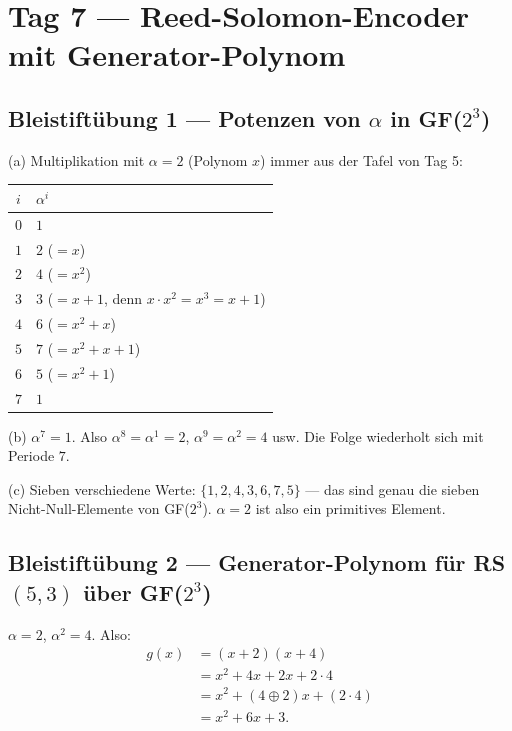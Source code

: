 \section{Tag 7 — Reed-Solomon-Encoder mit Generator-Polynom}

\subsection*{Bleistiftübung 1 — Potenzen von $\alpha$ in GF($2^3$)}

(a) Multiplikation mit $\alpha = 2$ (Polynom $x$) immer aus der
Tafel von Tag 5:

\begin{center}
\begin{tabular}{cl}
  \toprule
  $i$ & $\alpha^i$ \\
  \midrule
  $0$ & $1$ \\
  $1$ & $2$ ($= x$) \\
  $2$ & $4$ ($= x^2$) \\
  $3$ & $3$ ($= x + 1$, denn $x \cdot x^2 = x^3 = x + 1$) \\
  $4$ & $6$ ($= x^2 + x$) \\
  $5$ & $7$ ($= x^2 + x + 1$) \\
  $6$ & $5$ ($= x^2 + 1$) \\
  $7$ & $1$ \\
  \bottomrule
\end{tabular}
\end{center}

(b) $\alpha^7 = 1$. Also $\alpha^8 = \alpha^1 = 2$, $\alpha^9 =
\alpha^2 = 4$ usw. Die Folge wiederholt sich mit Periode $7$.

(c) Sieben verschiedene Werte: $\{1, 2, 4, 3, 6, 7, 5\}$ — das sind
genau die sieben Nicht-Null-Elemente von GF($2^3$). $\alpha = 2$ ist
also ein primitives Element.

\subsection*{Bleistiftübung 2 — Generator-Polynom für RS$(5,3)$ über GF($2^3$)}

$\alpha = 2$, $\alpha^2 = 4$. Also:
\begin{align*}
  g(x) &= (x + 2)(x + 4) \\
       &= x^2 + 4x + 2x + 2 \cdot 4 \\
       &= x^2 + (4 \oplus 2) x + (2 \cdot 4) \\
       &= x^2 + 6x + 3.
\end{align*}

